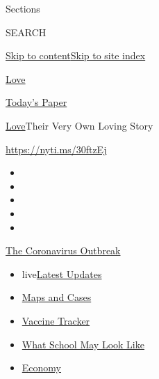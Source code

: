 Sections

SEARCH

\protect\hyperlink{site-content}{Skip to
content}\protect\hyperlink{site-index}{Skip to site index}

\href{https://www.nytimes.com/section/fashion/weddings}{Love}

\href{https://myaccount.nytimes.com/auth/login?response_type=cookie\&client_id=vi}{}

\href{https://www.nytimes.com/section/todayspaper}{Today's Paper}

\href{/section/fashion/weddings}{Love}\textbar{}Their Very Own Loving
Story

\url{https://nyti.ms/30ftzEj}

\begin{itemize}
\item
\item
\item
\item
\item
\end{itemize}

\href{https://www.nytimes.com/news-event/coronavirus?action=click\&pgtype=Article\&state=default\&region=TOP_BANNER\&context=storylines_menu}{The
Coronavirus Outbreak}

\begin{itemize}
\tightlist
\item
  live\href{https://www.nytimes.com/2020/08/01/world/coronavirus-covid-19.html?action=click\&pgtype=Article\&state=default\&region=TOP_BANNER\&context=storylines_menu}{Latest
  Updates}
\item
  \href{https://www.nytimes.com/interactive/2020/us/coronavirus-us-cases.html?action=click\&pgtype=Article\&state=default\&region=TOP_BANNER\&context=storylines_menu}{Maps
  and Cases}
\item
  \href{https://www.nytimes.com/interactive/2020/science/coronavirus-vaccine-tracker.html?action=click\&pgtype=Article\&state=default\&region=TOP_BANNER\&context=storylines_menu}{Vaccine
  Tracker}
\item
  \href{https://www.nytimes.com/interactive/2020/07/29/us/schools-reopening-coronavirus.html?action=click\&pgtype=Article\&state=default\&region=TOP_BANNER\&context=storylines_menu}{What
  School May Look Like}
\item
  \href{https://www.nytimes.com/live/2020/07/31/business/stock-market-today-coronavirus?action=click\&pgtype=Article\&state=default\&region=TOP_BANNER\&context=storylines_menu}{Economy}
\end{itemize}

